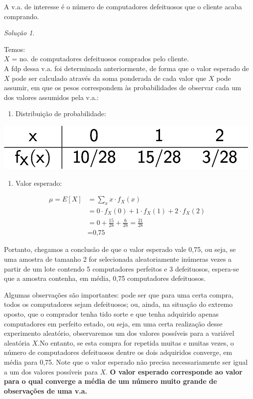 \documentclass[
]{book}
\providecommand{\tightlist}{%
  \setlength{\itemsep}{0pt}\setlength{\parskip}{0pt}}
\theoremstyle{definition}
\theoremstyle{definition}
\theoremstyle{definition}
\theoremstyle{remark}
\newtheorem*{solution}{Solução}
\begin{document}
A v.a. de interesse é o número de computadores defeituosos que o cliente acaba comprando.

\begin{solution}
{}
\end{solution}

Temos:\\
\(X\) = no. de computadores defeituosos comprados pelo cliente.\\
A fdp dessa v.a. foi determinada anteriormente, de forma que o valor esperado de \(X\) pode ser calculado através da soma ponderada de cada valor que \(X\) pode assumir, em que os pesos correspondem às probabilidades de observar cada um dos valores assumidos pela v.a.:

\begin{enumerate}
\def\labelenumi{\roman{enumi}.}
\tightlist
\item
  Distribuição de probabilidade:
\end{enumerate}

\includegraphics[width=0.5\linewidth]{img/comp-fdp}

\begin{enumerate}
\def\labelenumi{\roman{enumi}.}
\setcounter{enumi}{1}
\tightlist
\item
  Valor esperado:
\end{enumerate}

\begin{align*}
\mu = {E[X]} &= {\sum_x x \cdot f_X(x)}\\
    &= {0\cdot f_X(0) + 1\cdot f_X(1) + 2\cdot f_X(2)}\\
    &= {0 + \frac{15}{28} + \frac{6}{28} = \frac{21}{28}}\\
    &= \text{0,75}
\end{align*}

Portanto, chegamos a conclusão de que o valor esperado vale 0,75, ou seja, se uma amostra de tamanho 2 for selecionada aleatoriamente inúmeras vezes a partir de um lote contendo 5 computadores perfeitos e 3 defeituosos, espera-se que a amostra contenha, em média, 0,75 computadores defeituosos.

Algumas observações são importantes: pode ser que para uma certa compra, todos os computadores sejam defeituosos; ou, ainda, na situação do extremo oposto, que o comprador tenha tido sorte e que tenha adquirido apenas computadores em perfeito estado, ou seja, em uma certa realização desse experimento aleatório, observaremos um dos valores possíveis para a variável aleatória \(X\).No entanto, se esta compra for repetida muitas e muitas vezes, o número de computadores defeituosos dentre os dois adquiridos converge, em média para 0,75. Note que o valor esperado não precisa necessariamente ser igual a um dos valores possíveis para \(X\). \textbf{O valor esperado corresponde ao valor para o qual converge a média de um número muito grande de observações de uma v.a.}
\end{document}
